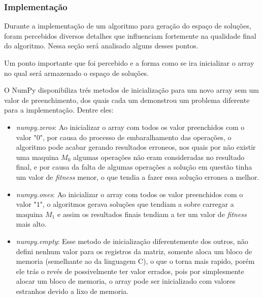         

        \subsubsection{Implementação}
            Durante a implementação de um algoritmo para geração do espaço de soluções, foram percebidos diversos detalhes que influenciam fortemente na qualidade final do algoritmo. Nessa seção será analisado alguns desses pontos.

                Um ponto importante que foi percebido e a forma como se ira inicializar o array no qual será armazenado o espaço de soluções.\newline

                O NumPy disponibiliza trés metodos de inicialização para um novo array sem um valor de preenchimento, dos quais cada um demonstrou um problema diferente para a implementação. Dentre eles: 
                \begin{itemize}
                    \item \textit{numpy.zeros}: Ao inicializar o array com todos os valor preenchidos com o valor "$0$", por causa do processo de embaralhamento das operações, o algoritmo pode acabar gerando resultados erroneos, nos quais por não existir uma maquina $M_0$ algumas operações não eram consideradas no resultado final, e por causa da falta de algumas operações a solução em questão tinha um valor de \textit{fitness} menor, o que tendia a fazer essa solução erronea a melhor.

                    \item \textit{numpy.ones}: Ao inicializar o array com todos os valor preenchidos com o valor "$1$", o algoritmos gerava soluções que tendiam a sobre carregar a maquina $M_1$ e assim os resultados finais tendiam a ter um valor de \textit{fitness} mais alto.

                    \item \textit{numpy.empty}: Esse metodo de inicialização diferentemente dos outros, não defini nenhum valor para os registros da matriz, somente aloca um bloco de memoria (semelhante ao  da linguagem C), o que o torna mais rapido, porém ele trás o revés de possivelmente ter valor errados, pois por simplesmente alocar um bloco de memoria, o array pode ser inicializado com valores estranhos devido a lixo de memoria.
                \end{itemize}

